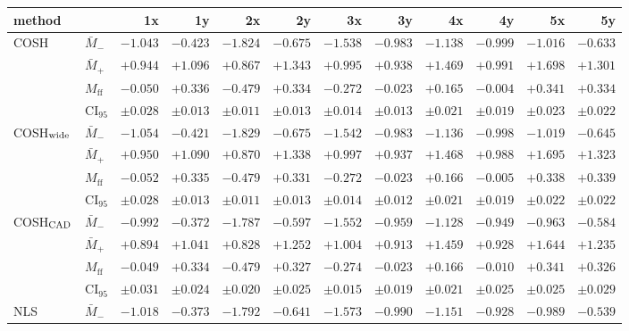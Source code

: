 \documentclass[10pt]{article}
\begin{document}
\begin{table}[t]
\centering
\footnotesize
\setlength{\tabcolsep}{3.2pt}
\begin{tabular}{ll rrrrrrrrrr}
\toprule
method & & 1x & 1y & 2x & 2y & 3x & 3y & 4x & 4y & 5x & 5y \\
\midrule
COSH & $\bar M_-$ & $-1.043$ & $-0.423$ & $-1.824$ & $-0.675$ & $-1.538$ & $-0.983$ & $-1.138$ & $-0.999$ & $-1.016$ & $-0.633$ \\
 & $\bar M_+$ & $+0.944$ & $+1.096$ & $+0.867$ & $+1.343$ & $+0.995$ & $+0.938$ & $+1.469$ & $+0.991$ & $+1.698$ & $+1.301$ \\
 & $M_{\mathrm{ff}}$ & $-0.050$ & $+0.336$ & $-0.479$ & $+0.334$ & $-0.272$ & $-0.023$ & $+0.165$ & $-0.004$ & $+0.341$ & $+0.334$ \\
 & CI$_{95}$ & $\pm0.028$ & $\pm0.013$ & $\pm0.011$ & $\pm0.013$ & $\pm0.014$ & $\pm0.013$ & $\pm0.021$ & $\pm0.019$ & $\pm0.023$ & $\pm0.022$ \\
\midrule
COSH$_{\rm wide}$ & $\bar M_-$ & $-1.054$ & $-0.421$ & $-1.829$ & $-0.675$ & $-1.542$ & $-0.983$ & $-1.136$ & $-0.998$ & $-1.019$ & $-0.645$ \\
 & $\bar M_+$ & $+0.950$ & $+1.090$ & $+0.870$ & $+1.338$ & $+0.997$ & $+0.937$ & $+1.468$ & $+0.988$ & $+1.695$ & $+1.323$ \\
 & $M_{\mathrm{ff}}$ & $-0.052$ & $+0.335$ & $-0.479$ & $+0.331$ & $-0.272$ & $-0.023$ & $+0.166$ & $-0.005$ & $+0.338$ & $+0.339$ \\
 & CI$_{95}$ & $\pm0.028$ & $\pm0.013$ & $\pm0.011$ & $\pm0.013$ & $\pm0.014$ & $\pm0.012$ & $\pm0.021$ & $\pm0.019$ & $\pm0.022$ & $\pm0.022$ \\
\midrule
COSH$_{\rm CAD}$ & $\bar M_-$ & $-0.992$ & $-0.372$ & $-1.787$ & $-0.597$ & $-1.552$ & $-0.959$ & $-1.128$ & $-0.949$ & $-0.963$ & $-0.584$ \\
 & $\bar M_+$ & $+0.894$ & $+1.041$ & $+0.828$ & $+1.252$ & $+1.004$ & $+0.913$ & $+1.459$ & $+0.928$ & $+1.644$ & $+1.235$ \\
 & $M_{\mathrm{ff}}$ & $-0.049$ & $+0.334$ & $-0.479$ & $+0.327$ & $-0.274$ & $-0.023$ & $+0.166$ & $-0.010$ & $+0.341$ & $+0.326$ \\
 & CI$_{95}$ & $\pm0.031$ & $\pm0.024$ & $\pm0.020$ & $\pm0.025$ & $\pm0.015$ & $\pm0.019$ & $\pm0.021$ & $\pm0.025$ & $\pm0.025$ & $\pm0.029$ \\
\midrule
NLS & $\bar M_-$ & $-1.018$ & $-0.373$ & $-1.792$ & $-0.641$ & $-1.573$ & $-0.990$ & $-1.151$ & $-0.928$ & $-0.989$ & $-0.539$ \\

\end{tabular}
\end{table}
\end{document}
